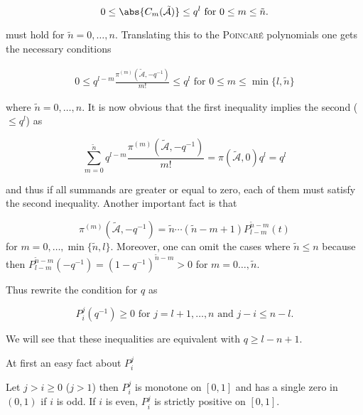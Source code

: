 \message{ !name(OnTheRAIDProblem.tex)}\documentclass[8pt,a4paper]{article}
\begin{document}
\begin{equation}
0 \leq \abs{C_m(\tilde{\mathcal{A}})} \leq q^l \text{ for } 0\leq m\leq\tilde{n}\text{.}
\end{equation}

must hold for $\tilde{n}=0,\ldots,n$. Translating this to the \textsc{Poincaré} polynomials one gets the necessary conditions

\begin{align}
0\leq q^{l-m}\frac{\pi^{(m)}(\tilde{\mathcal{A}},-q^{-1})}{m!} \leq q^l \text{ for } 0\leq m\leq\min\{l,\tilde{n}\}
\end{align}

where $\tilde{n}=0,\ldots,n$. It is now obvious that the first inequality implies the second ($\leq q^l$) as

\begin{equation}
\sum_{m=0}^{\tilde{n}}{q^{l-m}\frac{\pi^{(m)}(\tilde{\mathcal{A}},-q^{-1})}{m!}}=\pi(\tilde{\mathcal{A}},0)q^l=q^l
\end{equation}

and thus if all summands are greater or equal to zero, each of them must satisfy the second inequality. Another important fact is that

\begin{equation}
\pi^{(m)}(\tilde{\mathcal{A}},-q^{-1})=\tilde{n}\cdots(\tilde{n}-m+1)P_{l-m}^{\tilde{n}-m}(t)
\end{equation}
for $m=0,\ldots,\min\{\tilde{n},l\}$. Moreover, one can omit the cases where $\tilde{n}\leq n$ because then $P_{l-m}^{\tilde{n}-m}(-q^{-1})=(1-q^{-1})^{\tilde{n}-m}>0$ for $m=0\ldots,\tilde{n}$.

Thus rewrite the condition for $q$ as

\begin{equation}
P_i^j(q^{-1})\geq 0 \text{ for } j=l+1,\ldots,n \text{ and } j-i\leq n-l\text{.}
\end{equation}

We will see that these inequalities are equivalent with $q\geq l-n+1$.

At first an easy fact about $P_i^j$

\begin{lemma}
Let $j>i\geq 0$ ($j>1$) then $P_i^j$ is monotone on $[0,1]$ and has a single zero in $(0,1)$ if $i$ is odd.
If $i$ is even, $P_i^j$ is strictly positive on $[0,1]$.
\end{lemma}
\end{document}
